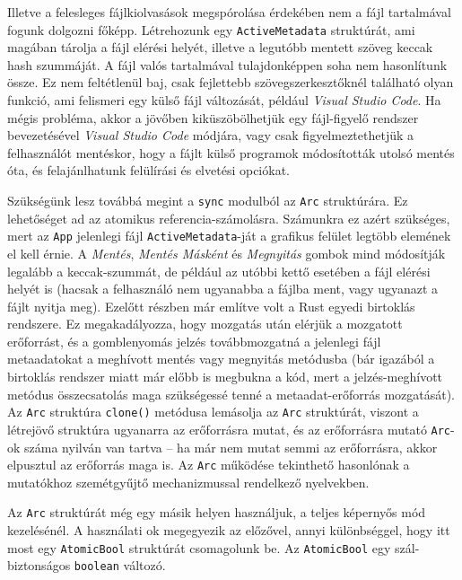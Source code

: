 Illetve a felesleges fájlkiolvasások megspórolása érdekében nem a fájl tartalmával fogunk dolgozni főképp.
Létrehozunk egy \texttt{ActiveMetadata} struktúrát, ami magában tárolja a fájl elérési helyét,
illetve a legutóbb mentett szöveg keccak hash szummáját.
A fájl valós tartalmával tulajdonképpen soha nem hasonlítunk össze.
Ez nem feltétlenül baj, csak fejlettebb szövegszerkesztőknél található olyan funkció, ami felismeri
egy külső fájl változását, például \textit{Visual Studio Code}.
Ha mégis probléma, akkor a jövőben kiküszöbölhetjük egy fájl-figyelő rendszer bevezetésével \textit{Visual Studio Code} módjára,
vagy csak figyelmeztethetjük a felhasználót mentéskor, hogy a fájlt külső programok módosították utolsó mentés óta,
és felajánlhatunk felülírási és elvetési opciókat.

Szükségünk lesz továbbá megint a \texttt{sync} modulból az \texttt{Arc} struktúrára.
Ez lehetőséget ad az atomikus referencia-számolásra.
Számunkra ez azért szükséges, mert az \texttt{App} jelenlegi fájl \texttt{ActiveMetadata}-ját
a grafikus felület legtöbb elemének el kell érnie.
A \textit{Mentés}, \textit{Mentés Másként} és \textit{Megnyitás} gombok mind módosítják legalább a keccak-szummát,
de például az utóbbi kettő esetében a fájl elérési helyét is (hacsak a felhasználó nem ugyanabba a fájlba ment,
vagy ugyanazt a fájlt nyitja meg).
Ezelőtt  részben már említve volt a Rust egyedi birtoklás rendszere.
Ez megakadályozza, hogy mozgatás után elérjük a mozgatott erőforrást, és a gomblenyomás jelzés
továbbmozgatná a jelenlegi fájl metaadatokat a meghívott mentés vagy megnyitás metódusba
(bár igazából a birtoklás rendszer miatt már előbb is megbukna a kód, mert a jelzés-meghívott metódus
összecsatolás maga szükségessé tenné a metaadat-erőforrás mozgatását).
Az \texttt{Arc} struktúra \texttt{clone()} metódusa lemásolja az \texttt{Arc} struktúrát,
viszont a létrejövő struktúra ugyanarra az erőforrásra mutat, és az erőforrásra mutató \texttt{Arc}-ok
száma nyilván van tartva -- ha már nem mutat semmi az erőforrásra, akkor elpusztul az erőforrás maga is.
Az \texttt{Arc} működése tekinthető hasonlónak a mutatókhoz szemétgyűjtő mechanizmussal rendelkező nyelvekben.

Az \texttt{Arc} struktúrát még egy másik helyen használjuk, a teljes képernyős mód kezelésénél.
A használati ok megegyezik az előzővel, annyi különbséggel, hogy itt most egy \texttt{AtomicBool} struktúrát csomagolunk be.
Az \texttt{AtomicBool} egy szál-biztonságos \texttt{boolean} változó.

